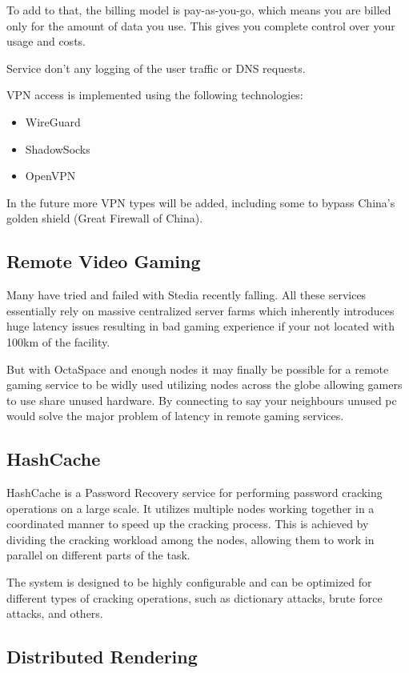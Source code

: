 To add to that, the billing model is pay-as-you-go, which means you are billed only for the amount of data you use.
This gives you complete control over your usage and costs.

Service don’t any logging of the user traffic or DNS requests.

VPN access is implemented using the following technologies:

\begin{itemize}
    \item WireGuard
    \item ShadowSocks
    \item OpenVPN
\end{itemize}

In the future more VPN types will be added, including some to bypass China's golden shield (Great Firewall of China).
\subsection{Remote Video Gaming}

Many have tried and failed with Stedia recently falling. All these services essentially rely on massive centralized server farms which inherently introduces huge latency issues resulting in bad gaming experience if your not located with 100km of the facility.

But with OctaSpace and enough nodes it may finally be possible for a remote gaming service to be widly used utilizing nodes across the globe allowing gamers to use share unused hardware. By connecting to say your neighbours unused pc would solve the major problem of latency in remote gaming services.

\subsection{HashCache}

HashCache is a Password Recovery service for performing password cracking operations on a large scale. It utilizes multiple nodes working together in a coordinated manner to speed up the cracking process. This is achieved by dividing the cracking workload among the nodes, allowing them to work in parallel on different parts of the task.

The system is designed to be highly configurable and can be optimized for different types of cracking operations, such as dictionary attacks, brute force attacks, and others.

\subsection{Distributed Rendering}

